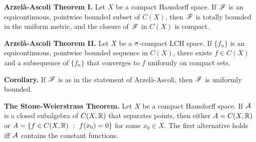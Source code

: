 \vs

\textbf{Arzel\`a-Ascoli Theorem I.} Let $X$ be a compact Hausdorff space. If $\mathscr{F}$ is an equicontinuous, pointwise bounded subset of $C(X)$, then $\mathscr{F}$ is totally bounded in the uniform metric, and the closure of $\mathscr{F}$ in $C(X)$ is compact.

\vs

\textbf{Arzel\`a-Ascoli Theorem II.} Let $X$ be a $\sigma$-compact LCH space. If $\{f_n\}$ is an equicontinuous, pointwise bounded sequence in $C(X)$, there exists $f\in C(X)$ and a subsequence of $\{f_n\}$ that converges to $f$ uniformly on compact sets.

\vs

\textbf{Corollary.} If $\mathscr{F}$ is as in the statement of Arzel\`a-Ascoli, then $\mathscr{F}$ is uniformly bounded.

\vs

\textbf{The Stone-Weierstrass Theorem.} Let $X$ be a compact Hausdorff space. If $\mathcal{A}$ is a closed subalgebra of $C(X,\mathbb{R})$ that separates points, then either $A = C(X,\mathbb{R})$ or $A = \{f\in C(X,\R)\ :\ f(x_0) = 0\}$ for some $x_0\in X$. The first alternative holds iff $\mathcal{A}$ contains the constant functions.




























